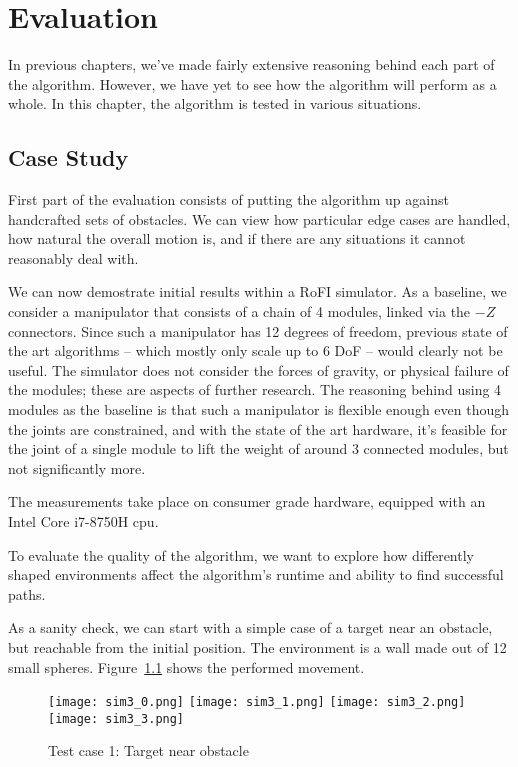 \chapter{Evaluation}

In previous chapters, we've made fairly extensive reasoning behind each part of the algorithm. However, we have yet to see how the algorithm will perform as a whole. In this chapter, the algorithm is tested in various situations.

\section{Case Study}

First part of the evaluation consists of putting the algorithm up against handcrafted sets of obstacles. We can view how particular edge cases are handled, how natural the overall motion is, and if there are any situations it cannot reasonably deal with.

We can now demostrate initial results within a RoFI simulator. As a baseline, we consider a manipulator that consists of a chain of 4 modules, linked via the $-Z$ connectors. Since such a manipulator has 12 degrees of freedom, previous state of the art algorithms -- which mostly only scale up to 6 DoF -- would clearly not be useful.
The simulator does not consider the forces of gravity, or physical failure of the modules; these are aspects of further research. The reasoning behind using 4 modules as the baseline is that such a manipulator is flexible enough even though the joints are constrained, and with the state of the art hardware, it's feasible for the joint of a single module to lift the weight of around 3 connected modules, but not significantly more.

The measurements take place on consumer grade hardware, equipped with an Intel Core i7-8750H cpu.

To evaluate the quality of the algorithm, we want to explore how differently shaped environments affect the algorithm's runtime and ability to find successful paths.

As a sanity check, we can start with a simple case of a target near an obstacle, but reachable from the initial position. The environment is a wall made out of 12 small spheres. Figure~\ref{fig:sim3} shows the performed movement.

\begin{figure}
  \centering
  \begin{minipage}{\textwidth}
    \texttt{[image: sim3\_0.png]}
    \texttt{[image: sim3\_1.png]}
    \texttt{[image: sim3\_2.png]}
    \texttt{[image: sim3\_3.png]}
  \end{minipage}
  \caption{Test case 1: Target near obstacle}\label{fig:sim3}
\end{figure}

